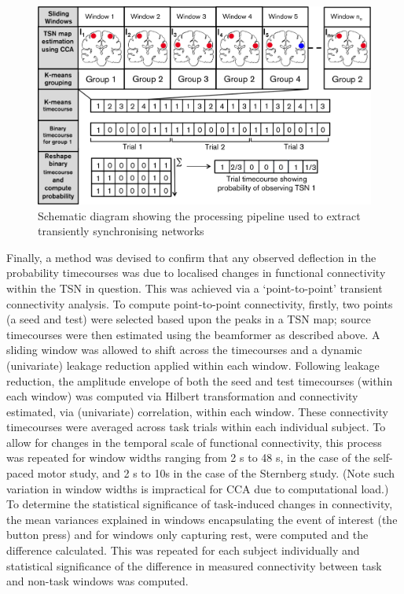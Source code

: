 	\begin{figure}[h]
		\begin{center}
			\includegraphics[width=\linewidth]{./images/chapter5/Figure_2.png}
			\caption{Schematic diagram showing the processing pipeline used to extract transiently synchronising networks \label{figure_5_2}}
		\end{center}
	\end{figure}

Finally, a method was devised to confirm that any observed deflection in the probability timecourses was due to localised changes in functional connectivity within the TSN in question. This was achieved via a ‘point-to-point’ transient connectivity analysis. To compute point-to-point connectivity, firstly, two points (a seed and test) were selected based upon the peaks in a TSN map; source timecourses were then estimated using the beamformer as described above. A sliding window was allowed to shift across the timecourses and a dynamic (univariate) leakage reduction applied within each window. Following leakage reduction, the amplitude envelope of both the seed and test timecourses (within each window) was computed via Hilbert transformation and connectivity estimated, via (univariate) correlation, within each window. These connectivity timecourses were averaged across task trials within each individual subject. To allow for changes in the temporal scale of functional connectivity, this process was repeated for window widths ranging from 2 s to 48 s, in the case of the self-paced motor study, and 2 s to 10s in the case of the Sternberg study. (Note such variation in window widths is impractical for CCA due to computational load.) To determine the statistical significance of task-induced changes in connectivity, the mean variances explained in windows encapsulating the event of interest (the button press) and for windows only capturing rest, were computed and the difference calculated. This was repeated for each subject individually and statistical significance of the difference in measured connectivity between task and non-task windows was computed.

